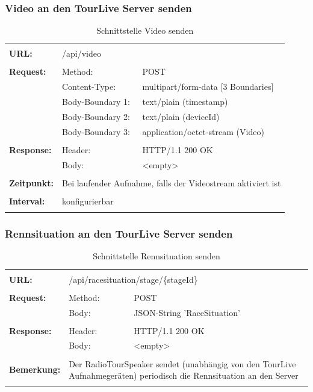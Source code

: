 \subsubsection{Video an den TourLive Server senden}
\begin{longtable}{ p{2.5cm} || p{3.5cm} p{5.5cm}}
&  \\ [-1.5ex]
	\textbf{URL:} & \multicolumn{2}{p{9cm}}{/api/video}  \\ [1ex] \hline & &  \\ [-1.5ex]
	\textbf{Request:} & Method: & POST \\
		& Content-Type: & multipart/form-data [3 Boundaries] \\
		& Body-Boundary 1: & text/plain (timestamp) \\
		& Body-Boundary 2: & text/plain (deviceId) \\
		& Body-Boundary 3: & application/octet-stream (Video)  \\ [1ex] \hline & &  \\ [-1.5ex]
	\textbf{Response:} & Header: & HTTP/1.1 200 OK \\
		& Body: & <empty>  \\ [1ex] \hline & &  \\ [-1.5ex]
	\textbf{Zeitpunkt:} & \multicolumn{2}{p{9cm}}{Bei laufender Aufnahme, falls der Videostream aktiviert ist}  \\ [1ex] \hline & &  \\ [-1.5ex]
	\textbf{Interval:} & \multicolumn{2}{p{9cm}}{konfigurierbar}  \\ [1ex] 
	\caption{Schnittstelle Video senden} 
\end{longtable}

\newpage
\subsubsection{Rennsituation an den TourLive Server senden}
\begin{longtable}{ p{2.5cm} || p{3.5cm} p{5.5cm}}
&  \\ [-1.5ex]
	\textbf{URL:} & \multicolumn{2}{p{9cm}}{/api/racesituation/stage/\{stageId\}}  \\ [1ex] \hline & &  \\ [-1.5ex]
	\textbf{Request:} & Method: & POST \\
		& Body: & JSON-String 'RaceSituation' \\ [1ex] \hline & &  \\ [-1.5ex]
	\textbf{Response:} & Header: & HTTP/1.1 200 OK \\
		& Body: & <empty>  \\ [1ex] \hline & &  \\ [-1.5ex]	
	\textbf{Bemerkung:} & \multicolumn{2}{p{9cm}}{Der RadioTourSpeaker sendet (unabhängig von den TourLive Aufnahmegeräten) periodisch die Rennsituation an den Server} \\ [1ex] 
	\caption{Schnittstelle Rennsituation senden}
\end{longtable}

